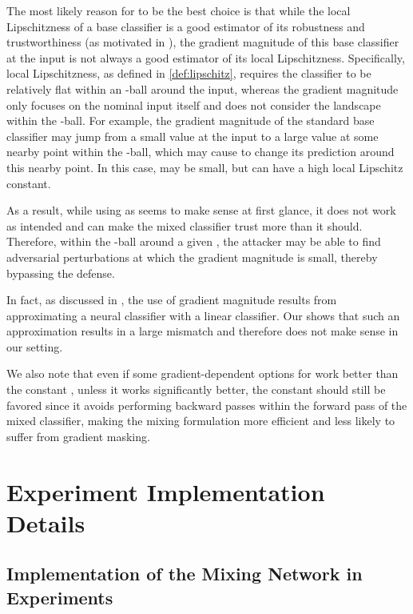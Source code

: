 \documentclass[11pt, letterpaper]{article}
\theoremstyle{plain}
\theoremstyle{definition}
\begin{document}
The most likely reason for  to be the best choice is that while the local Lipschitzness of a base classifier is a good estimator of its robustness and trustworthiness (as motivated in \citep{Anderson21b}), the gradient magnitude of this base classifier at the input is not always a good estimator of its local Lipschitzness. Specifically, local Lipschitzness, as defined in \cref{def:lipschitz}, requires the classifier to be relatively flat within an -ball around the input, whereas the gradient magnitude only focuses on the nominal input itself and does not consider the landscape within the -ball. For example, the gradient magnitude of the standard base classifier  may jump from a small value at the input to a large value at some nearby point within the -ball, which may cause  to change its prediction around this nearby point. In this case,  may be small, but  can have a high local Lipschitz constant.

As a result, while using  as  seems to make sense at first glance, it does not work as intended and can make the mixed classifier trust  more than it should. Therefore, within the -ball around a given , the attacker may be able to find adversarial perturbations at which the gradient magnitude is small, thereby bypassing the defense.

In fact, as discussed in \citep{Anderson21b}, the use of gradient magnitude results from approximating a neural classifier with a linear classifier. Our  shows that such an approximation results in a large mismatch and therefore does not make sense in our setting.
	
We also note that even if some gradient-dependent options for  work better than the constant , unless it works significantly better, the constant  should still be favored since it avoids performing backward passes within the forward pass of the mixed classifier, making the mixing formulation more efficient and less likely to suffer from gradient masking.



\section{Experiment Implementation Details}

\subsection{Implementation of the Mixing Network in Experiments} \label{sec:mixing_arch_rn}
\end{document}
